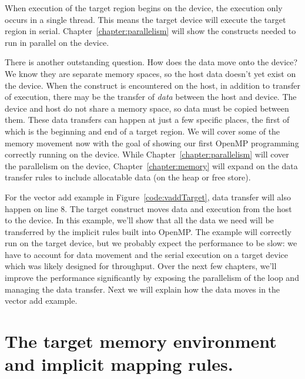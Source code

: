 When execution of the target region begins on the device, the execution only occurs in a single thread.
This means the target device will execute the target region in serial.
Chapter~\ref{chapter:parallelism} will show the constructs needed to run in parallel on the device.

There is another outstanding question.
How does the data move onto the device?
We know they are separate memory spaces, so the host data doesn't yet exist on the device.
When the  construct is encountered on the host, in addition to transfer of execution, there may be the transfer of \emph{data} between the host and device.
The device and host do not share a memory space, so data must be copied between them.
These data transfers can happen at just a few specific places, the first of which is the beginning and end of a target region.
We will cover some of the memory movement now with the goal of showing our first OpenMP programming correctly running on the device.
While Chapter~\ref{chapter:parallelism} will cover the parallelism on the device, Chapter~\ref{chapter:memory} will expand on the data transfer rules to include allocatable data (on the heap or free store).

For the vector add example in Figure~\ref{code:vaddTarget}, data transfer will also happen on line 8.
The target construct moves data and execution from the host to the device.
In this example, we'll show that all the data we need will be transferred by the implicit rules built into OpenMP.
The example will correctly run on the target device, but we probably expect the performance to be slow: we have to account for data movement and the serial execution on a target device which was likely designed for throughput.
Over the next few chapters, we'll improve the performance significantly by exposing the parallelism of the loop and managing the data transfer.
Next we will explain how the data moves in the vector add example.


\section{The target memory environment and implicit mapping rules.}

